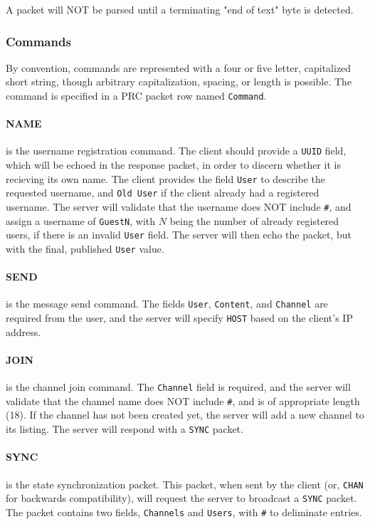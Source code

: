 \documentclass{article}
\begin{document}
A packet will NOT be parsed until a terminating "end of text" byte is detected.

\subsubsection{Commands}
By convention, commands are represented with a four or five letter, capitalized short string, though arbitrary capitalization, spacing, or length is possible. The command is specified in a PRC packet row named \verb|Command|.

\paragraph{NAME} is the username registration command. The client should provide a \verb|UUID| field, which will be echoed in the response packet, in order to discern whether it is recieving its own name. The client provides the field \verb|User| to describe the requested username, and \verb|Old User| if the client already had a registered username. The server will validate that the username does NOT include \verb|#|, and assign a username of \verb|GuestN|, with $N$ being the number of already registered users, if there is an invalid \verb|User| field. The server will then echo the packet, but with the final, published \verb|User| value.

\paragraph{SEND} is the message send command. The fields \verb|User|, \verb|Content|, and \verb|Channel| are required from the user, and the server will specify \verb|HOST| based on the client's IP address.

\paragraph{JOIN} is the channel join command. The \verb|Channel| field is required, and the server will validate that the channel name does NOT include \verb|#|, and is of appropriate length (18). If the channel has not been created yet, the server will add a new channel to its listing. The server will respond with a \verb|SYNC| packet.

\paragraph{SYNC} is the state synchronization packet. This packet, when sent by the client (or, \verb|CHAN| for backwards compatibility), will request the server to broadcast a \verb|SYNC| packet. The packet contains two fields, \verb|Channels| and \verb|Users|, with \verb|#| to deliminate entries.
\end{document}
